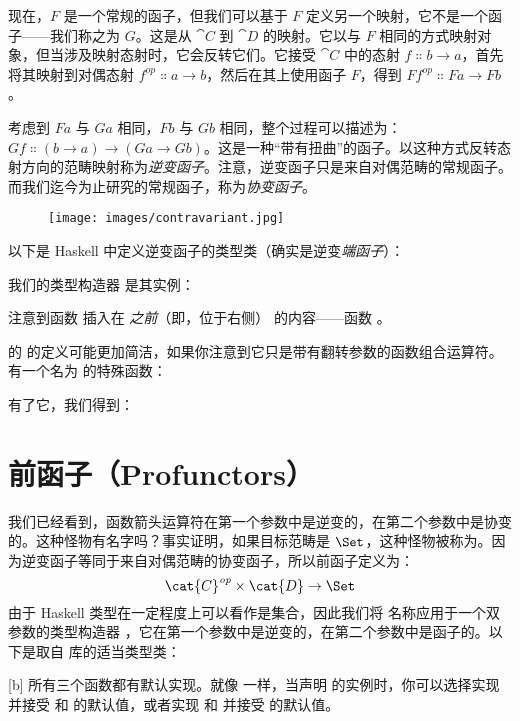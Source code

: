 现在，$F$ 是一个常规的函子，但我们可以基于 $F$ 定义另一个映射，它不是一个函子——我们称之为 $G$。这是从 $\cat{C}$ 到 $\cat{D}$ 的映射。它以与 $F$ 相同的方式映射对象，但当涉及映射态射时，它会反转它们。它接受 $\cat{C}$ 中的态射 $f \Colon b \to a$，首先将其映射到对偶态射 $f^\mathit{op} \Colon a \to b$，然后在其上使用函子 $F$，得到 $F f^\mathit{op} \Colon F a \to F b$。

考虑到 $F a$ 与 $G a$ 相同，$F b$ 与 $G b$ 相同，整个过程可以描述为：$G f \Colon (b \to a) \to (G a \to G b)$。这是一种“带有扭曲”的函子。以这种方式反转态射方向的范畴映射称为\emph{逆变函子}。注意，逆变函子只是来自对偶范畴的常规函子。而我们迄今为止研究的常规函子，称为\emph{协变函子}。

\begin{figure}[H]
  \centering
  \texttt{[image: images/contravariant.jpg]}
\end{figure}

\noindent
以下是 Haskell 中定义逆变函子的类型类（确实是逆变\emph{端函子}）：

我们的类型构造器  是其实例：

注意到函数  插入在 \emph{之前}（即，位于右侧） 的内容——函数 。

 的  的定义可能更加简洁，如果你注意到它只是带有翻转参数的函数组合运算符。有一个名为  的特殊函数：

有了它，我们得到：


\section{前函子（Profunctors）}

我们已经看到，函数箭头运算符在第一个参数中是逆变的，在第二个参数中是协变的。这种怪物有名字吗？事实证明，如果目标范畴是 $\Set$，这种怪物被称为。因为逆变函子等同于来自对偶范畴的协变函子，所以前函子定义为：
\[\cat{C}^\mathit{op} \times \cat{D} \to \Set\]
由于 Haskell 类型在一定程度上可以看作是集合，因此我们将  名称应用于一个双参数的类型构造器 ，它在第一个参数中是逆变的，在第二个参数中是函子的。以下是取自  库的适当类型类：

[b]
所有三个函数都有默认实现。就像  一样，当声明  的实例时，你可以选择实现  并接受  和  的默认值，或者实现  和  并接受  的默认值。

